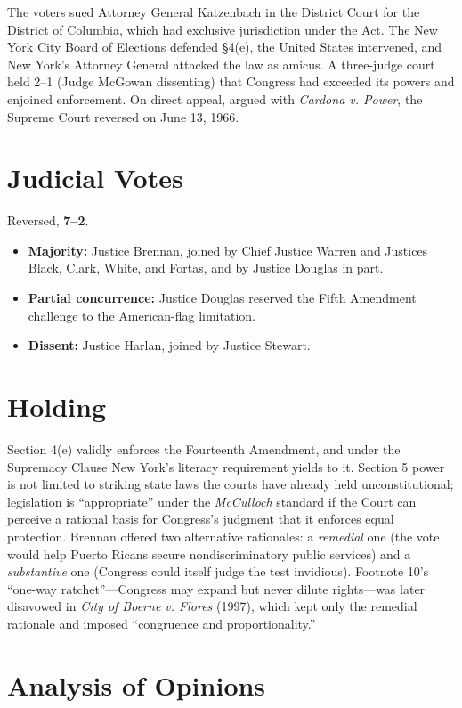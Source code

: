 \documentclass[12pt]{article}
\begin{document}
The voters sued Attorney General Katzenbach in the District Court for the District of Columbia, which had exclusive jurisdiction under the Act. The New York City Board of Elections defended \S 4(e), the United States intervened, and New York's Attorney General attacked the law as amicus. A three-judge court held 2--1 (Judge McGowan dissenting) that Congress had exceeded its powers and enjoined enforcement. On direct appeal, argued with \textit{Cardona v. Power}, the Supreme Court reversed on June 13, 1966.

\section{Judicial Votes}

Reversed, \textbf{7--2}.
\begin{itemize}
\item \textbf{Majority:} Justice Brennan, joined by Chief Justice Warren and Justices Black, Clark, White, and Fortas, and by Justice Douglas in part.
\item \textbf{Partial concurrence:} Justice Douglas reserved the Fifth Amendment challenge to the American-flag limitation.
\item \textbf{Dissent:} Justice Harlan, joined by Justice Stewart.
\end{itemize}

\section{Holding}

Section 4(e) validly enforces the Fourteenth Amendment, and under the Supremacy Clause New York's literacy requirement yields to it. Section 5 power is not limited to striking state laws the courts have already held unconstitutional; legislation is ``appropriate'' under the \textit{McCulloch} standard if the Court can perceive a rational basis for Congress's judgment that it enforces equal protection. Brennan offered two alternative rationales: a \emph{remedial} one (the vote would help Puerto Ricans secure nondiscriminatory public services) and a \emph{substantive} one (Congress could itself judge the test invidious). Footnote 10's ``one-way ratchet''---Congress may expand but never dilute rights---was later disavowed in \textit{City of Boerne v. Flores} (1997), which kept only the remedial rationale and imposed ``congruence and proportionality.''

\section{Analysis of Opinions}
\end{document}

